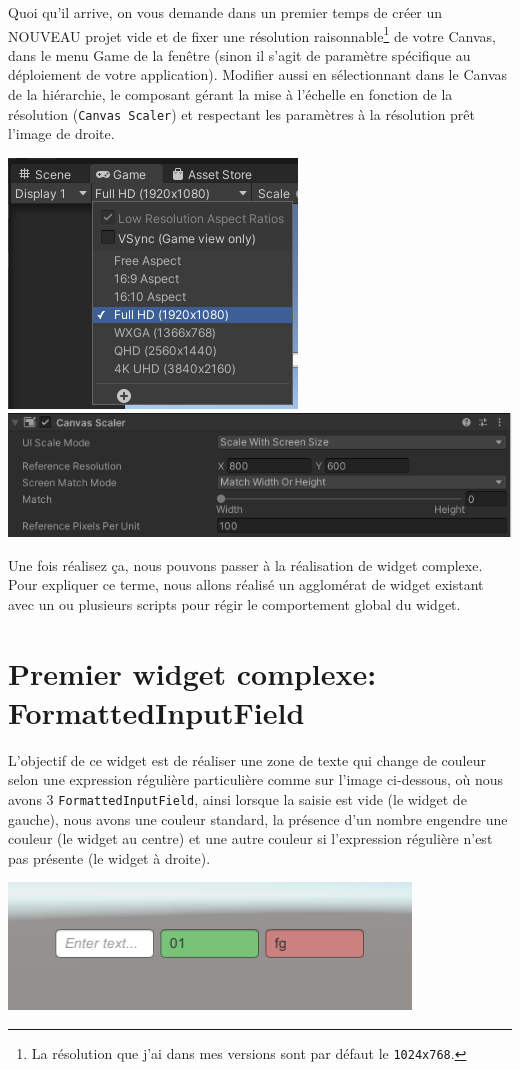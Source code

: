 \documentclass[a4paper,10pt]{article}
\begin{document}
Quoi qu'il arrive, on vous demande dans un premier temps de créer un NOUVEAU projet vide et de fixer une résolution raisonnable\footnote{La résolution que j'ai dans mes versions sont par défaut le \texttt{1024x768}.} de votre Canvas, dans le menu Game de la fenêtre (sinon il s'agit de paramètre spécifique au déploiement de votre application). Modifier aussi en sélectionnant dans le Canvas de la hiérarchie, le composant gérant la mise à l'échelle en fonction de la résolution (\texttt{Canvas Scaler}) et respectant les paramètres à la résolution prêt l'image de droite.

\begin{center}
\hfill	\includegraphics[width=0.3\linewidth]{rc/unity_set_ui_resolution_game}%
\hfill	\includegraphics[width=0.6\linewidth]{rc/unity_set_ui_resolution_canvas_scaler}%
\hfill
\end{center}

Une fois réalisez ça, nous pouvons passer à la réalisation de widget complexe. Pour expliquer ce terme, nous allons réalisé un agglomérat de widget existant avec un ou plusieurs scripts pour régir le comportement global du widget.

\section{Premier widget complexe: FormattedInputField}

L'objectif de ce widget est de réaliser une zone de texte qui change de couleur selon une expression régulière particulière comme sur l'image ci-dessous, où nous avons 3 \texttt{FormattedInputField}, ainsi lorsque la saisie est vide (le widget de gauche), nous avons une couleur standard, la présence d'un nombre engendre une couleur (le widget au centre) et une autre couleur si l'expression régulière n'est pas présente (le widget à droite).
\begin{center}
	\includegraphics[width=0.4\linewidth]{rc/widget_formattetinputfield_start}
\end{center}
\end{document}
